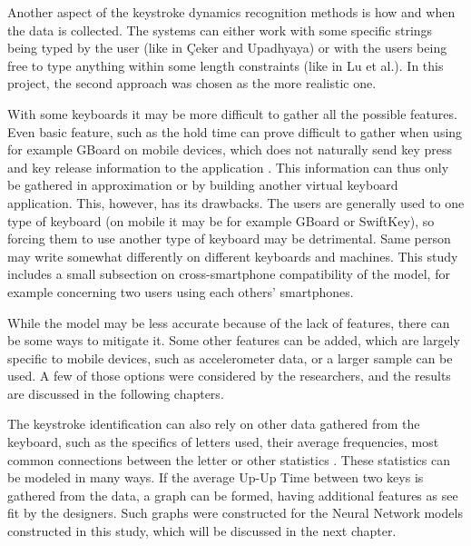 Another aspect of the keystroke dynamics recognition methods is how and when the data is collected. The systems can either work with some specific strings being typed by the user (like in Çeker and Upadhyaya) or with the users being free to type anything within some length constraints (like in Lu et al.). In this project, the second approach was chosen as the more realistic one.

With some keyboards it may be more difficult to gather all the possible features. Even basic feature, such as the hold time can prove difficult to gather when using for example GBoard on mobile devices, which does not naturally send key press and key release information to the application \cite{android_keyboard_commands_2025}. This information can thus only be gathered in approximation or by building another virtual keyboard application. This, however, has its drawbacks. The users are generally used to one type of keyboard (on mobile it may be for example GBoard or SwiftKey), so forcing them to use another type of keyboard may be detrimental. Same person may write somewhat differently on different keyboards and machines. This study includes a small subsection on cross-smartphone compatibility of the model, for example concerning two users using each others' smartphones.

While the model may be less accurate because of the lack of features, there can be some ways to mitigate it. Some other features can be added, which are largely specific to mobile devices, such as accelerometer data, or a larger sample can be used. A few of those options were considered by the researchers, and the results are discussed in the following chapters.

The keystroke identification can also rely on other data gathered from the keyboard, such as the specifics of letters used, their average frequencies, most common connections between the letter or other statistics \cite{Wang2024}. These statistics can be modeled in many ways. If the average Up-Up Time between two keys is gathered from the data, a graph can be formed, having additional features as see fit by the designers. Such graphs were constructed for the Neural Network models constructed in this study, which will be discussed in the next chapter.